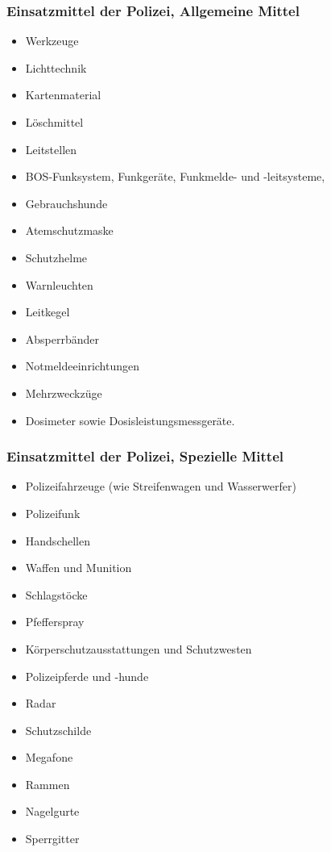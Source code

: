 \documentclass[]{beamer}
\begin{document}
\begin{frame}
		\frametitle{Einsatzmittel der Polizei, Allgemeine Mittel }
		\begin{itemize}
			\item Werkzeuge
			\item Lichttechnik
			\item Kartenmaterial 
			\item Löschmittel
			\item Leitstellen
			\item BOS-Funksystem, Funkgeräte, Funkmelde- und -leitsysteme, 
			\item Gebrauchshunde 
			\item Atemschutzmaske 
			\item Schutzhelme
			\item Warnleuchten
			\item Leitkegel
			\item Absperrbänder
			\item Notmeldeeinrichtungen
			\item Mehrzweckzüge
			\item Dosimeter sowie Dosisleistungsmessgeräte.
		\end{itemize}
	\end{frame}
	
	\begin{frame}
		\frametitle{Einsatzmittel der Polizei, Spezielle Mittel }
		\begin{itemize}
			\item Polizeifahrzeuge (wie Streifenwagen und Wasserwerfer)
			\item Polizeifunk
			\item Handschellen
			\item Waffen und Munition
			\item Schlagstöcke
			\item Pfefferspray
			\item Körperschutzausstattungen und Schutzwesten
			\item Polizeipferde und -hunde
			\item Radar
			\item Schutzschilde
			\item Megafone
			\item Rammen
			\item Nagelgurte 
			\item Sperrgitter
		\end{itemize}	
	\end{frame}
\end{document}

